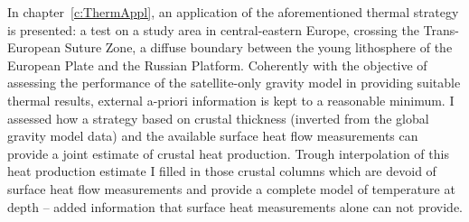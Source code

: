 In chapter~\ref{c:ThermAppl}, an application of the aforementioned thermal strategy is presented: a test on a study area in central-eastern Europe, crossing the Trans-European Suture Zone, a diffuse boundary between the young lithosphere of the European Plate and the Russian Platform.
Coherently with the objective of assessing the performance of the satellite-only gravity model in providing suitable thermal results, external a-priori information is kept to a reasonable minimum.
I assessed how a strategy based on crustal thickness (inverted from the global gravity model data) and the available surface heat flow measurements can provide a joint estimate of crustal heat production.
Trough interpolation of this heat production estimate I filled in those crustal columns which are devoid of surface heat flow measurements and provide a complete model of temperature at depth -- added information that surface heat measurements alone can not provide.
